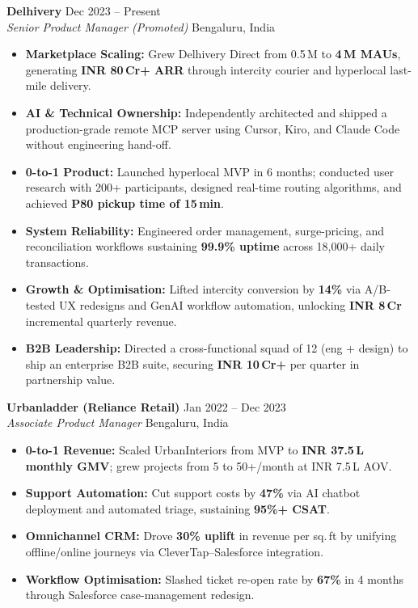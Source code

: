 \documentclass[letterpaper,10.5pt]{article}
\newcommand{\roleheader}[4]{%
  \vspace{4pt}
  \noindent\textbf{\color{darktext}#1}%
  \hfill{\small\color{lighttext}#4}\\[1pt]
  {\color{medtext}\textit{#2}}%
  \hfill{\small\color{lighttext}#3}%
  \vspace{2pt}
}
\newcommand{\metric}[1]{\textbf{#1}}
\begin{document}
\roleheader{Delhivery}{Senior Product Manager \textnormal{(Promoted)}}{Bengaluru, India}{Dec 2023 -- Present}
\begin{itemize}
  \item \textbf{Marketplace Scaling:} Grew Delhivery Direct from 0.5\,M to \metric{4\,M MAUs}, generating \metric{INR 80\,Cr+ ARR} through intercity courier and hyperlocal last-mile delivery.
  \item \textbf{AI \& Technical Ownership:} Independently architected and shipped a production-grade remote MCP server using Cursor, Kiro, and Claude Code without engineering hand-off.
  \item \textbf{0-to-1 Product:} Launched hyperlocal MVP in 6 months; conducted user research with 200+ participants, designed real-time routing algorithms, and achieved \metric{P80 pickup time of 15\,min}.
  \item \textbf{System Reliability:} Engineered order management, surge-pricing, and reconciliation workflows sustaining \metric{99.9\% uptime} across 18,000+ daily transactions.
  \item \textbf{Growth \& Optimisation:} Lifted intercity conversion by \metric{14\%} via A/B-tested UX redesigns and GenAI workflow automation, unlocking \metric{INR 8\,Cr} incremental quarterly revenue.
  \item \textbf{B2B Leadership:} Directed a cross-functional squad of 12 (eng + design) to ship an enterprise B2B suite, securing \metric{INR 10\,Cr+} per quarter in partnership value.
\end{itemize}

\roleheader{Urbanladder \textnormal{\small(Reliance Retail)}}{Associate Product Manager}{Bengaluru, India}{Jan 2022 -- Dec 2023}
\begin{itemize}
  \item \textbf{0-to-1 Revenue:} Scaled UrbanInteriors from MVP to \metric{INR 37.5\,L monthly GMV}; grew projects from 5 to 50+/month at INR 7.5\,L AOV.
  \item \textbf{Support Automation:} Cut support costs by \metric{47\%} via AI chatbot deployment and automated triage, sustaining \metric{95\%+ CSAT}.
  \item \textbf{Omnichannel CRM:} Drove \metric{30\% uplift} in revenue per sq.\,ft by unifying offline/online journeys via CleverTap--Salesforce integration.
  \item \textbf{Workflow Optimisation:} Slashed ticket re-open rate by \metric{67\%} in 4 months through Salesforce case-management redesign.
\end{itemize}
\end{document}
